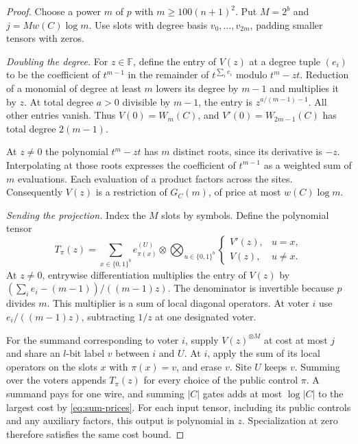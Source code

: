 \begin{proof}
Choose a power \(m\) of \(p\) with \(m\ge100(n+1)^2\). Put
\(M=2^b\) and \(j=Mw(C)\log m\). Use slots with degree basis
\(v_0,\ldots,v_{2m}\), padding smaller tensors with zeros.

\emph{Doubling the degree.}
For \(z\in\mathbb F\), define the entry of \(V(z)\) at a degree tuple
\((e_i)\) to be the coefficient of \(t^{m-1}\) in the remainder of
\(t^{\sum_i e_i}\) modulo \(t^m-zt\). Reduction of a monomial of
degree at least \(m\) lowers its degree by \(m-1\) and multiplies it
by \(z\). At total degree \(a>0\) divisible by \(m-1\), the entry is
\(z^{a/(m-1)-1}\). All other entries vanish. Thus \(V(0)=W_m(C)\),
and \(V'(0)=W_{2m-1}(C)\) has total degree \(2(m-1)\).

At \(z\ne0\) the polynomial \(t^m-zt\) has \(m\) distinct roots,
since its derivative is \(-z\). Interpolating at those roots expresses
the coefficient of \(t^{m-1}\) as a weighted sum of \(m\) evaluations.
Each evaluation of a product factors across the sites. Consequently
\(V(z)\) is a restriction of \(G_C(m)\), of price at most \(w(C)\log m\).

\emph{Sending the projection.}
Index the \(M\) slots by symbols. Define the polynomial tensor
\begin{equation}\label{eq:vote-derivative}
 T_\pi(z)=\sum_{x\in\{0,1\}^b} e_{\pi(x)}^{(U)}
           \otimes\bigotimes_{u\in\{0,1\}^b}
             \begin{cases} V'(z),&u=x,\\ V(z),&u\ne x. \end{cases}
\end{equation}
At \(z\ne0\), entrywise differentiation multiplies the entry of \(V(z)\)
by \((\sum_i e_i-(m-1))/((m-1)z)\). The denominator is invertible
because \(p\) divides \(m\). This multiplier is a sum of local
diagonal operators. At voter \(i\) use \(e_i/((m-1)z)\), subtracting
\(1/z\) at one designated voter.

For the summand corresponding to voter \(i\), supply \(V(z)^{\otimes M}\)
at cost at most \(j\) and share an \(l\)-bit label \(v\) between \(i\)
and \(U\). At \(i\), apply the sum of its local operators on the slots
\(x\) with \(\pi(x)=v\), and erase \(v\). Site \(U\) keeps \(v\).
Summing over the voters appends \(T_\pi(z)\) for every choice of the
public control \(\pi\). A summand pays for one wire, and summing
\(|C|\) gates adds at most \(\log|C|\) to the largest cost by
\eqref{eq:sum-prices}. For each input tensor, including its public
controls and any auxiliary factors, this output is polynomial in \(z\).
Specialization at zero therefore satisfies the same cost bound.


\end{proof}
